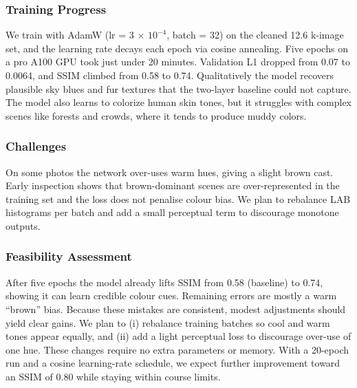 \documentclass{article} %
\begin{document}
\subsubsection{Training Progress}

We train with AdamW (lr = 3 × $10^{-4}$, batch = 32) on the cleaned 12.6 k-image set, and the learning rate decays each epoch via cosine annealing. Five epochs on a pro A100 GPU took just under 20 minutes. Validation L1 dropped from 0.07 to 0.0064, and SSIM climbed from 0.58 to 0.74. Qualitatively the model recovers plausible sky blues and fur textures that the two-layer baseline could not capture. The model also learns to colorize human skin tones, but it struggles with complex scenes like forests and crowds, where it tends to produce muddy colors.

\subsubsection{Challenges}

On some photos the network over-uses warm hues, giving a slight brown cast. Early inspection shows that brown-dominant scenes are over-represented in the training set and the loss does not penalise colour bias. We plan to rebalance LAB histograms per batch and add a small perceptual term to discourage monotone outputs.

\subsubsection{Feasibility Assessment}

After five epochs the model already lifts SSIM from 0.58 (baseline) to 0.74, showing it can learn credible colour cues. Remaining errors are mostly a warm “brown” bias. Because these mistakes are consistent, modest adjustments should yield clear gains. We plan to (i) rebalance training batches so cool and warm tones appear equally, and (ii) add a light perceptual loss to discourage over-use of one hue. These changes require no extra parameters or memory. With a 20-epoch run and a cosine learning-rate schedule, we expect further improvement toward an SSIM of 0.80 while staying within course limits.

\label{last_page}

\newpage


\end{document}
